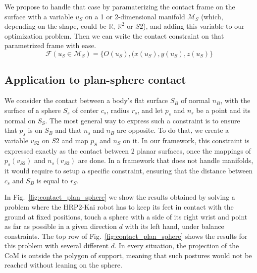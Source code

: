 We propose to handle that case by paramaterizing the contact frame on the surface with a variable $u_S$ on a 1 or 2-dimensional manifold $\mathcal{M}_S$ (which, depending on the shape, could be $\mathbb{R}$, $\mathbb{R}^2$ or $S2$), and adding this variable to our optimization problem.
Then we can write the contact constraint on that parametrized frame with ease.
\begin{equation}
\label{eq:param_frame}
  \mathcal{F}(u_S\in \mathcal{M}_S) = \{O(u_S), (x(u_S), y(u_S), z(u_S)\}
\end{equation}


\subsection{Application to plan-sphere contact}
We consider the contact between a body's flat surface $S_B$ of normal $n_B$, with the surface of a sphere $S_s$ of center $c_s$, radius $r_s$, and let $p_s$ and $n_s$ be a point and its normal on $S_S$.
The most general way to express such a constraint is to ensure that $p_s$ is on $S_B$ and that $n_s$ and $n_B$ are opposite.
To do that, we create a variable $v_{S2}$ on $S2$ and map $p_S$ and $n_S$ on it.
In our framework, this constraint is expressed exactly as the contact between 2 planar surfaces, once the mappings of $p_s(v_{S2})$ and $n_s(v_{S2})$ are done.
In a framework that does not handle manifolds, it would require to setup a specific constraint, ensuring that the distance between $c_s$ and $S_B$ is equal to $r_S$.

In Fig.~\ref{fig:contact_plan_sphere} we show the results obtained by solving a problem where the HRP2-Kai robot has to keep its feet in contact with the ground at fixed positions, touch a sphere with a side of its right wrist and point as far as possible in a given direction $d$ with its left hand, under balance constraints.
The top row of Fig.~\ref{fig:contact_plan_sphere} shows the results for this problem with several different $d$.
In every situation, the projection of the CoM is outside the polygon of support, meaning that such postures would not be reached without leaning on the sphere.

